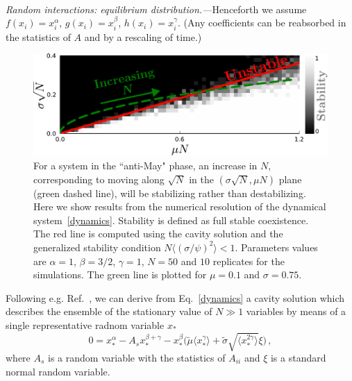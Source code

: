 \documentclass[
 prl,
 twocolumn,
 amsmath,
 amssymb,
 aps,
]{revtex4-2}
\begin{document}
\paragraph*{}
\emph{Random interactions: equilibrium distribution.---}Henceforth we assume $f(x_i)=x_i^{\alpha}$, $g(x_i)=x_i^{\beta}$, $h(x_i)=x_i^{\gamma}$. 
(Any coefficients can be reabsorbed in the statistics of $A$ and by a rescaling of time.)
\begin{figure}[t!]
    \includegraphics[width=.45\textwidth]{beta1_5-S50-N10-diversity-increase.pdf}
    \caption{For a system in the ``anti-May" phase, an increase in $N$,
    corresponding to moving along $\sqrt{N}$ in the $(\sigma \sqrt{N},\mu N)$ plane (green dashed line), will be stabilizing rather than destabilizing.
    Here we show results from the numerical resolution of the dynamical system~\eqref{dynamics}. Stability is defined as full stable coexistence. The red line is computed using the cavity solution and the generalized stability condition $N\langle (\sigma/\psi)^2\rangle < 1$.
    Parameters values are $\alpha=1$, $\beta=3/2$,
    $\gamma=1$, $N=50$ and $10$ replicates for the simulations. The green line is plotted for $\mu=0.1$ and $\sigma=0.75$.}
    \label{fig: stability line + sims}
\end{figure}
Following e.g. Ref.~\cite{Roy2019}, we can derive from Eq.~\eqref{dynamics} a cavity solution which describes the ensemble of the stationary value of $N\gg 1$ variables by means of a single representative radnom variable $x_*$
\begin{equation}
    0 = x_*^{\alpha}-A_sx_*^{\beta+\gamma}-x_*^{\beta}\big( \tilde{\mu} \langle x_*^{\gamma}\rangle + \tilde{\sigma} \sqrt{\langle x_*^{2\gamma}\rangle}\xi\big) \, ,
\label{eq: dmft}
\end{equation}
where $A_s$ is a random variable with the statistics of $A_{ii}$ and $\xi$ is a standard normal random variable. 
\end{document}
